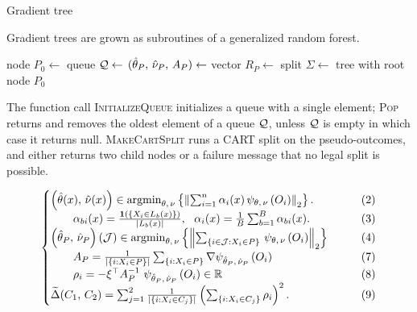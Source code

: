 \documentclass[aos]{imsart}
\theoremstyle{plain}
\theoremstyle{definition}
\theoremstyle{remark}
\begin{document}
\begin{CJK}{UTF8}{gbsn}
\begin{algorithm}[t]
\caption{Gradient tree}\label{alg:tree}
\vspace{-0.4\baselineskip}
\justify
Gradient trees are grown as subroutines of a generalized random forest.
\begin{algorithmic}[1]
\State node $P_0 \gets$ 
\State queue $\mathcal{Q} \gets$ 
\State $(\hat{\theta}_P, \, \hat{\nu}_P, \, A_P) \gets$ 
\State vector $R_P \gets$ 
\State split $\Sigma \gets$ 
\State {}
\State {}
\State {}
\EndIf
\EndWhile
{} tree with root node $P_0$
\EndProcedure
\end{algorithmic}
\justify
The function call \textsc{InitializeQueue} initializes a queue with a single element;
\textsc{Pop} returns and removes the oldest element of a queue $\mathcal{Q}$,
unless $\mathcal{Q}$ is empty in which case it returns null. \textsc{MakeCartSplit} runs a CART split
on the pseudo-outcomes, and either returns two child nodes or a failure message that no legal
split is possible.
\end{algorithm}


\begin{equation*}
\begin{cases}
\p{\htheta(x), \, \hnu(x)} \in \argmin_{\theta, \, \nu} \cb{\Norm{\sum_{i = 1}^n \alpha_i(x) \, \psi_{\theta, \, \nu}\p{O_i}}_2}. &\qquad (2) \\
\qquad  \alpha_{bi}(x) = \frac{\1\p{\cb{X_i \in L_b(x)}}}{\abs{L_b(x)}}, \ \ \alpha_i(x) = \frac{1}{B} \sum_{b = 1}^B \alpha_{bi}(x).  &\qquad (3) \\
\p{\htheta_P, \, \hnu_P}(\mathcal{J}) \in \argmin_{\theta, \, \nu} \cb{\Norm{\sum_{\cb{i\in\mathcal{J} : X_i \in P}} \, \psi_{\theta, \, \nu}\p{O_i}}_2}   &\qquad (4) \\
\qquad A_P = \frac{1}{\abs{\cb{i : X_i \in P}}} \sum_{\cb{i : X_i \in P}} \nabla \psi_{\htheta_P, \, \hnu_P}\p{O_i} &\qquad (7) \\
\qquad  \rho_i = -\xi^\top A_P^{-1} \ \psi_{\htheta_P, \, \hnu_P}\p{O_i} \in \RR &\qquad (8) \\
\tDelta(C_1, \, C_2) =  \sum_{j = 1}^2\frac{1}{\abs{\cb{i : X_i \in C_j}}}\p{ \sum_{\cb{i : X_i \in C_j}} \rho_i}^2. &\qquad (9)
\end{cases}
\end{equation*}


\end{CJK}
\end{document}
